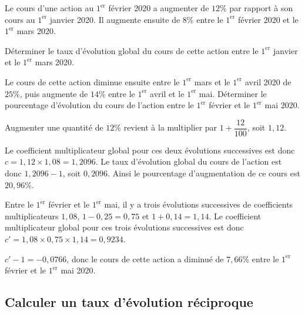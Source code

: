 \documentclass[11pt,a4paper]{book}
\begin{document}
\begin{bmethode}
    
    Le cours d'une action au $1^{\text{er}}$ février 2020 a augmenter de $12\%$ par rapport à son cours au $1^{\text{er}}$ janvier 2020. Il augmente ensuite de $8\%$ entre le $1^{\text{er}}$ février 2020 et le $1^{\text{er}}$ mars 2020.
    
    \begin{enumMet}
        \item Déterminer le taux d'évolution global du cours de cette action entre le $1^{\text{er}}$ janvier et le $1^{\text{er}}$ mars 2020.
        \item Le cours de cette action diminue ensuite entre le $1^{\text{er}}$ mars et le $1^{\text{er}}$ avril 2020 de $25\%$, puis augmente de $14\%$ entre le $1^{\text{er}}$ avril et le $1^{\text{er}}$ mai. Déterminer le pourcentage d'évolution du cours de l'action entre le $1^{\text{er}}$ février et le $1^{\text{er}}$ mai 2020.
    \end{enumMet}
    
    \begin{enumMet}
        \item Augmenter une quantité de $12\%$ revient à la multiplier par $1+\dfrac{12}{100}$, soit $1,12$.
        
        Le coefficient multiplicateur global pour ces deux évolutions successives est donc $c=1,12\times1,08=1,2096$. Le taux d'évolution global du cours de l'action est donc $1,2096-1$, soit $0,2096$. Ainsi le pourcentage d'augmentation de ce cours est $20,96\%$. 
        \item Entre le $1^{\text{er}}$ février et le $1^{\text{er}}$ mai, il y a trois évolutions successives de coefficients multiplicateurs $1,08$, $1-0,25=0,75$ et $1+0,14=1,14$. Le coefficient multiplicateur global pour ces trois évolutions successives est donc $c'=1,08\times0,75\times1,14=0,9234$.
        
        $c'-1=-0,0766$, donc le cours de cette action a diminué de $7,66\%$ entre le $1^{\text{er}}$ février et le $1^{\text{er}}$ mai 2020. 
    \end{enumMet}
\end{bmethode}

\vspace*{-0.8cm}
\subsection{Calculer un taux d'évolution réciproque}
\end{document}
